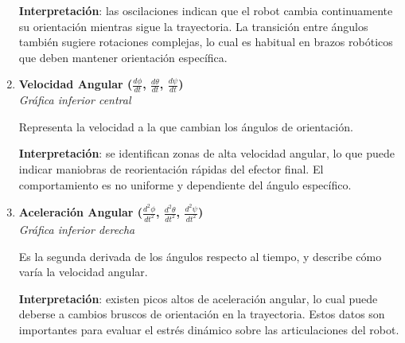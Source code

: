 \begin{enumerate}
 	\textbf{Interpretación}: las oscilaciones indican que el robot cambia continuamente su orientación mientras sigue la trayectoria. La transición entre ángulos también sugiere rotaciones complejas, lo cual es habitual en brazos robóticos que deben mantener orientación específica.
 	
 	\item \textbf{Velocidad Angular ($\frac{d\phi}{dt}$, $\frac{d\theta}{dt}$, $\frac{d\psi}{dt}$)} \\
 	\textit{Gráfica inferior central}
 	
 	Representa la velocidad a la que cambian los ángulos de orientación.
 	
 	\textbf{Interpretación}: se identifican zonas de alta velocidad angular, lo que puede indicar maniobras de reorientación rápidas del efector final. El comportamiento es no uniforme y dependiente del ángulo específico.
 	
 	\item \textbf{Aceleración Angular ($\frac{d^2\phi}{dt^2}$, $\frac{d^2\theta}{dt^2}$, $\frac{d^2\psi}{dt^2}$)} \\
 	\textit{Gráfica inferior derecha}
 	
 	Es la segunda derivada de los ángulos respecto al tiempo, y describe cómo varía la velocidad angular.
 	
 	\textbf{Interpretación}: existen picos altos de aceleración angular, lo cual puede deberse a cambios bruscos de orientación en la trayectoria. Estos datos son importantes para evaluar el estrés dinámico sobre las articulaciones del robot.
 \end{enumerate}
 